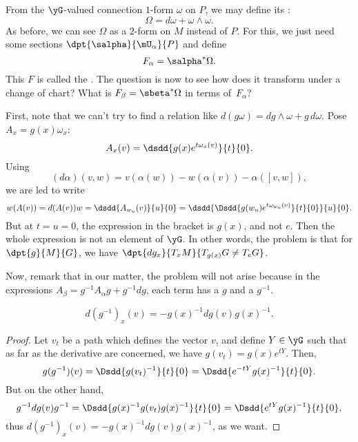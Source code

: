 From the $\yG$-valued connection $1$-form $\omega$ on $P$, we may define its :
\begin{equation}
     \Omega=d\omega+\omega\wedge\omega.
\end{equation}
As before, we can see $\Omega$ as a $2$-form on $M$ instead of $P$. For this, we just need some sections $\dpt{\salpha}{\mU_{\alpha}}{P}$ and define
\begin{equation}
        F_{\alpha}=\salpha^*\Omega.
\end{equation}
This $F$ is called the . The question is now to see how does it transform under a change of chart? What is $F_{\beta}=\sbeta^*\Omega$ in terms of~$F_{\alpha}$?

First, note that we can't try to find a relation like $d(g\omega)=dg\wedge\omega+g\,d\omega$. Pose $A_x=g(x)\omega_x$:
\[
  A_x(v)=\dsdd{g(x)e^{t\omega_x(v)}}{t}{0}.
\]
Using
\[
   (d\alpha)(v,w)=v(\alpha(w))-w(\alpha(v))-\alpha([v,w]),
\]
we are led to write
\begin{equation}
     w(A(v))=d(A(v))w
            =\dsdd{A_{w_u}(v)}{u}{0}
	    =\dsdd{ \Dsdd{g(w_u)e^{t\omega_{w_u}(v)}}{t}{0} }{u}{0}.
\end{equation}
But at $t=u=0$, the expression in the bracket is $g(x)$, and not $e$. Then the whole expression is not an element of $\yG$. In other words, the problem is that for $\dpt{g}{M}{G}$, we have $\dpt{dg_x}{T_xM}{T_{g(x)}G\neq T_eG}$.

Now, remark that in our matter, the problem will not arise because in the expressions $A_{\beta}=g^{-1} A_{\alpha} g+g^{-1} dg$, each term has a $g$ and a $g^{-1}$.

\begin{lemma}
\begin{equation}
   d(g^{-1})_x(v)=-g(x)^{-1} dg(v)g(x)^{-1}.
\end{equation}
\label{lem:dgemu}
\end{lemma}

\begin{proof}
Let $v_t$ be a path which defines the vector $v$, and define $Y\in\yG$ such that as far as the derivative are concerned, we have $g(v_t)=g(x)e^{tY}$. Then,
\[
      g(g^{-1})(v)=\Dsdd{g(v_t)^{-1}}{t}{0}=\Dsdd{e^{-tY}g(x)^{-1}}{t}{0}.
\]
But on the other hand,
\[
  g^{-1} dg(v)g^{-1}=\Dsdd{g(x)^{-1} g(v_t)g(x)^{-1}}{t}{0}=\Dsdd{e^{tY}g(x)^{-1}}{t}{0},
\]
thus $d(g^{-1})_x(v)=-g(x)^{-1} dg(v)g(x)^{-1}$, as we want.
\end{proof}

